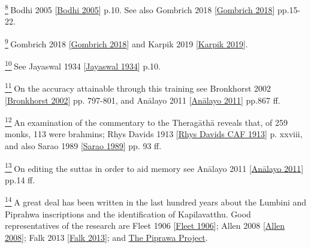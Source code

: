 \label{footprints_split_024.html_fn8}
\hyperref[footprints_split_005.htmlux5cux23fnref8]{\textsuperscript{8}} {Bodhi
2005
{{[}\hyperref[footprints_split_022.htmlux5cux23Bodhiux5cux25202005]{Bodhi
2005}{]}}} p.10. See also {Gombrich 2018
{{[}\hyperref[footprints_split_022.htmlux5cux23Gombrichux5cux25202018]{Gombrich
2018}{]}}} pp.15-22.

\label{footprints_split_024.html_fn9}
\hyperref[footprints_split_005.htmlux5cux23fnref9]{\textsuperscript{9}} {Gombrich
2018
{{[}\hyperref[footprints_split_022.htmlux5cux23Gombrichux5cux25202018]{Gombrich
2018}{]}}} and {Karpik 2019
{{[}\hyperref[footprints_split_022.htmlux5cux23Karpikux5cux25202019]{Karpik
2019}{]}}}.

\label{footprints_split_024.html_fn10}
\hyperref[footprints_split_005.htmlux5cux23fnref10]{\textsuperscript{10}} See
{Jayaswal 1934
{{[}\hyperref[footprints_split_022.htmlux5cux23Jayaswalux5cux25201934]{Jayaswal
1934}{]}}} p.10.

\label{footprints_split_024.html_fn11}
\hyperref[footprints_split_005.htmlux5cux23fnref11]{\textsuperscript{11}} On
the accuracy attainable through this training see {Bronkhorst 2002
{{[}\hyperref[footprints_split_022.htmlux5cux23Bronkhorstux5cux25202002]{Bronkhorst
2002}{]}}} pp. 797-801, and {Anālayo 2011
{{[}\hyperref[footprints_split_022.htmlux5cux23Anux101layoux5cux25202011]{Anālayo
2011}{]}}} pp.867 ff.

\label{footprints_split_024.html_fn12}
\hyperref[footprints_split_005.htmlux5cux23fnref12]{\textsuperscript{12}} An
examination of the commentary to the Theragāthā reveals that, of 259
monks, 113 were brahmins; {Rhys Davids 1913
{{[}\hyperref[footprints_split_022.htmlux5cux23Rhysux5cux2520Davidsux5cux2520CAFux5cux25201913]{Rhys
Davids CAF 1913}{]}}} p. xxviii, and also {Sarao 1989
{{[}\hyperref[footprints_split_022.htmlux5cux23Saraoux5cux25201989]{Sarao
1989}{]}}} pp. 93 ff.

\label{footprints_split_024.html_fn13}
\hyperref[footprints_split_005.htmlux5cux23fnref13]{\textsuperscript{13}} On
editing the suttas in order to aid memory see {Anālayo 2011
{{[}\hyperref[footprints_split_022.htmlux5cux23Anux101layoux5cux25202011]{Anālayo
2011}{]}}} pp.14 ff.

\label{footprints_split_024.html_fn14}
\hyperref[footprints_split_005.htmlux5cux23fnref14]{\textsuperscript{14}} A
great deal has been written in the last hundred years about the Lumbini
and Piprahwa inscriptions and the identification of Kapilavatthu. Good
representatives of the research are {Fleet 1906
{{[}\hyperref[footprints_split_022.htmlux5cux23Fleetux5cux25201906]{Fleet
1906}{]}}}; {Allen 2008
{{[}\hyperref[footprints_split_022.htmlux5cux23Allenux5cux25202008]{Allen
2008}{]}}}; {Falk 2013
{{[}\hyperref[footprints_split_022.htmlux5cux23Falkux5cux25202013]{Falk
2013}{]}}}; and \href{http://www.piprahwa.com/home}{The Piprawa
Project}.

